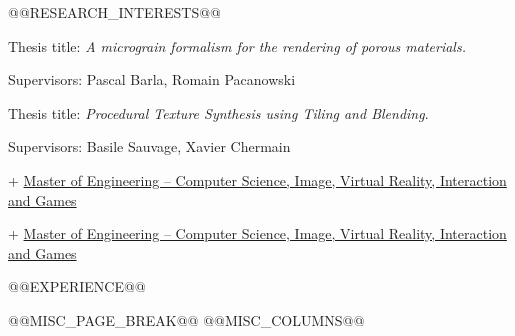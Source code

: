 \documentclass[10pt,a4paper,ragged2e]{altacv}
\begin{document}

\makecvheader

@@RESEARCH_INTERESTS@@

\par Thesis title: \emph{A micrograin formalism for the rendering of porous materials.}
\par Supervisors: Pascal Barla, Romain Pacanowski

\par Thesis title: \emph{Procedural Texture Synthesis using Tiling and Blending}.
\par Supervisors: Basile Sauvage, Xavier Chermain
\par + \href{https://mathinfo.unistra.fr/formations/cursus-master-ingenierie-en-informatique/odf-parcours-cursus-master-ingenierie-cmi-informatique-systemes-et-reseaux-PR1233-18114/}{Master of Engineering -- Computer Science, Image, Virtual Reality, Interaction and Games}

\par + \href{https://mathinfo.unistra.fr/formations/cursus-master-ingenierie-en-informatique/odf-parcours-cursus-master-ingenierie-cmi-informatique-systemes-et-reseaux-PR1233-18114/}{Master of Engineering -- Computer Science, Image, Virtual Reality, Interaction and Games}


@@EXPERIENCE@@

\clearpage
{}
\nocite{*}
\vspace{-5mm}
\printbibliography[title={Journal Articles\medskip},type=article]
\vspace{-5mm}
\printbibliography[title={Conference Proceedings\medskip},type=inproceedings]
\vspace{-5mm}
\printbibliography[title={Thesis\medskip},type=thesis]

@@MISC_PAGE_BREAK@@
@@MISC_COLUMNS@@
\end{document}
